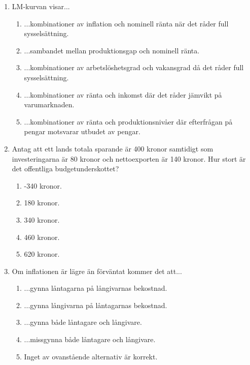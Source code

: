 \documentclass[12pt,a4paper]{article}
\begin{document}
\begin{enumerate}[label=\arabic*.]
    \item LM-kurvan visar...
    \begin{enumerate}[label=\Alph*.]
        \item ...kombinationer av inflation och nominell ränta när det råder full sysselsättning.
        \item ...sambandet mellan produktionsgap och nominell ränta.
        \item ...kombinationer av arbetslöshetsgrad och vakansgrad då det råder full sysselsättning.
        \item ...kombinationer av ränta och inkomst där det råder jämvikt på varumarknaden.
        \item ...kombinationer av ränta och produktionsnivåer där efterfrågan på pengar motsvarar utbudet av pengar.
    \end{enumerate}

    \item Antag att ett lands totala sparande är 400 kronor samtidigt som investeringarna är 80 kronor och nettoexporten är 140 kronor. Hur stort är det offentliga budgetunderskottet?
    \begin{enumerate}[label=\Alph*.]
        \item -340 kronor.
        \item 180 kronor.
        \item 340 kronor.
        \item 460 kronor.
        \item 620 kronor.
    \end{enumerate}

    \item Om inflationen är lägre än förväntat kommer det att...
    \begin{enumerate}[label=\Alph*.]
        \item ...gynna låntagarna på långivarnas bekostnad.
        \item ...gynna långivarna på låntagarnas bekostnad.
        \item ...gynna både låntagare och långivare.
        \item ...missgynna både låntagare och långivare.
        \item Inget av ovanstående alternativ är korrekt.
    \end{enumerate}


\end{enumerate}
\end{document}
